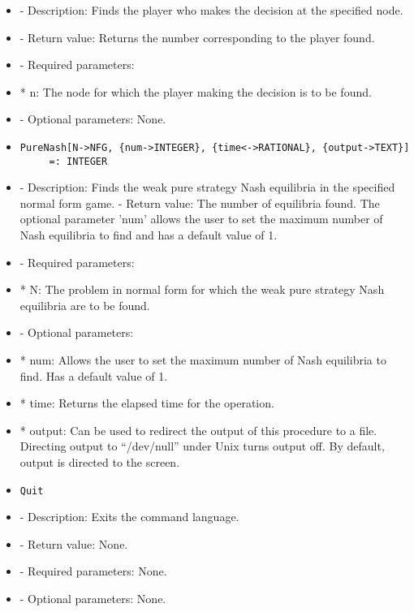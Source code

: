\begin{itemize}
\bd
\item
- Description:  Finds the player who makes the decision at the specified
node.
\item
- Return value:  Returns the number corresponding to the player found.
\item
- Required parameters:

\bd
\item
*  n:  The node for which the player making the decision is to be
found.
\ed

\item
- Optional parameters:  None.

\item
\begin{verbatim}
PureNash[N->NFG, {num->INTEGER}, {time<->RATIONAL}, {output->TEXT}]
	 =: INTEGER
\end{verbatim}

\bd
\item
- Description:  Finds the weak pure strategy Nash equilibria in the 
specified normal form game.  
- Return value:  The number of equilibria found.  The optional parameter 
'num' allows the user to set the maximum number of Nash equilibria to 
find and has a default value of 1.
\item
- Required parameters:
	
\bd
\item
*  N:  The problem in normal form for which the weak pure strategy
Nash equilibria are to be found.
\ed

\item
- Optional parameters:
	
\bd
\item
*  num:  Allows the user to set the maximum number of Nash equilibria
to find.  Has a default value of 1.
\item
*  time:  Returns the elapsed time for the operation.
\item
*  output:  Can be used to redirect the output of this procedure to a
file.  Directing output to ``/dev/null'' under Unix turns 
output off.  By default, output is directed to the screen.  

\ed
\ed

\item

\begin{verbatim}
Quit
\end{verbatim}

\bd

\item
- Description:  Exits the command language.
\item
- Return value:  None.
\item
- Required parameters:  None.
\item
- Optional parameters:  None.
\ed


\end{itemize}
